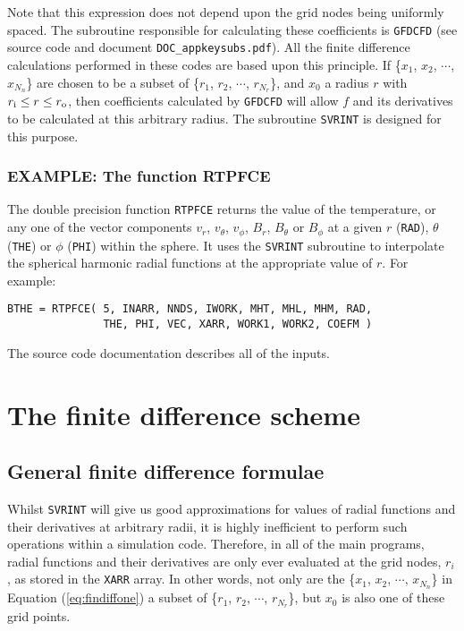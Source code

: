 \label{eq:findiffone}
\eeq
Note that this expression does not depend upon the
grid nodes being uniformly spaced.
The subroutine responsible for calculating these
coefficients is \verb+GFDCFD+ (see source code and document
\verb+DOC_appkeysubs.pdf+).
All the finite difference calculations performed in these
codes are based upon this principle.
If \{$x_1$, $x_2$, $\cdots$, $x_{N_n}$\} are chosen
to be a subset of \{$r_1$, $r_2$, $\cdots$, $r_{N_r}$\},
and $x_0$ a radius $r$ with $r_{\rm i} \leq r \leq r_{\rm o}$,
then coefficients calculated by
\verb+GFDCFD+ will allow $f$ and its
derivatives to be calculated at 
this arbitrary radius.
The subroutine \verb+SVRINT+ is designed for this purpose.

\subsubsection{ EXAMPLE: The function RTPFCE }
\label{subsubsec:rtpfcefunction}

The double precision function \verb+RTPFCE+
returns the value of the temperature, or any one
of the vector components $v_{r}$, $v_{\theta}$, $v_{\phi}$,
$B_{r}$, $B_{\theta}$ or $B_{\phi}$ at a given 
$r$ (\verb+RAD+),
$\theta$ (\verb+THE+) or
$\phi$ (\verb+PHI+) within the sphere.
It uses the \verb+SVRINT+ subroutine to interpolate
the spherical harmonic radial functions at the 
appropriate value of $r$.
For example:
\begin{verbatim}
BTHE = RTPFCE( 5, INARR, NNDS, IWORK, MHT, MHL, MHM, RAD,
               THE, PHI, VEC, XARR, WORK1, WORK2, COEFM )
\end{verbatim}
The source code documentation describes all of the inputs.

\section{The finite difference scheme}
\label{sec:finitediffscheme}

\subsection{General finite difference formulae}
\label{subsec:genfinitediffform}

Whilst \verb+SVRINT+ will give us good approximations
for values of radial functions and their derivatives
at arbitrary radii, it is highly inefficient to perform
such operations within a simulation code.
Therefore, in all of the main programs, radial functions
and their derivatives
are only ever evaluated 
at the grid nodes, $r_i$, as stored in the 
\verb+XARR+ array. In other words, not only
are the \{$x_1$, $x_2$, $\cdots$, $x_{N_n}$\}
in Equation (\ref{eq:findiffone}) a subset of
\{$r_1$, $r_2$, $\cdots$, $r_{N_r}$\}, but
$x_0$ is also one of these grid points.

